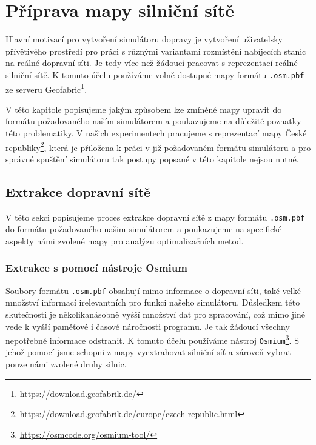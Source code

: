 \chapter{Příprava mapy silniční sítě}
\label{chap:priprava_mapy}

Hlavní motivací pro vytvoření simulátoru dopravy je vytvoření uživatelsky
přívětivého prostředí pro práci s různými variantami rozmístění nabíjecích 
stanic na reálné dopravní síti. Je tedy více než žádoucí pracovat s reprezentací
reálné silniční sítě. K tomuto účelu používáme volně dostupné mapy formátu
\texttt{.osm.pbf} ze serveru 
Geofabric\footnote{\url{https://download.geofabrik.de/}}. 

V této kapitole popisujeme jakým způsobem lze zmíněné mapy upravit do formátu
požadovaného naším simulátorem a poukazujeme na důležité poznatky této problematiky. 
V našich experimentech pracujeme s reprezentací mapy 
České republiky\footnote{\url{https://download.geofabrik.de/europe/czech-republic.html}},
která je přiložena k práci v již požadovaném formátu simulátoru a pro správné spuštění
simulátoru tak postupy popsané v této kapitole nejsou nutné. 


\section{Extrakce dopravní sítě}
\label{sec:extrakce_site}

V této sekci popisujeme proces extrakce dopravní sítě z mapy formátu 
\texttt{.osm.pbf} do formátu požadovaného našim simulátorem a poukazujeme
na specifické aspekty námi zvolené mapy pro analýzu optimalizačních metod.


\subsection{Extrakce s pomocí nástroje Osmium}

Soubory formátu \texttt{.osm.pbf} obsahují mimo informace o dopravní síti,
také velké množství informací irelevantních pro funkci našeho simulátoru. 
Důsledkem této skutečnosti je několikanásobně vyšší množství dat pro 
zpracování, což mimo jiné vede k vyšší paměťové i časové náročnosti programu.
Je tak žádoucí všechny nepotřebné informace odstranit. K tomuto účelu
používáme nástroj \texttt{Osmium}\footnote{\url{https://osmcode.org/osmium-tool/}}.
S jehož pomocí jsme schopni z mapy vyextrahovat silniční síť a zároveň
vybrat pouze námi zvolené druhy silnic.

